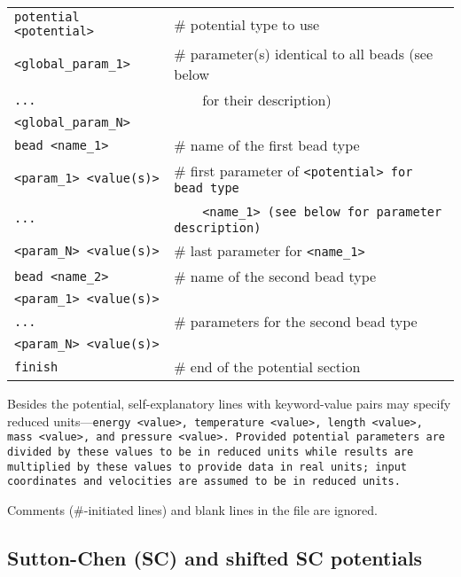 \begin{longtable}{ll}
  \tt{potential <potential>} & \# potential type to use\\
  \tt{<global_param_1>}      & \# parameter(s) identical to all beads (see
                               below\\
  \tt{...}                   & \ \ \ \ for their description)\\
  \tt{<global_param_N>}      & \\
  \tt{bead <name_1>}         & \# name of the first bead type\\
  \tt{<param_1> <value(s)>}  & \# first parameter of \tt{<potential>} for
                               bead type\\
  \tt{...}                   & \ \ \ \ \tt{<name_1>} (see below for parameter
                               description)\\
  \tt{<param_N> <value(s)>}  & \# last parameter for \tt{<name_1>}\\
  \tt{bead <name_2>}         & \# name of the second bead type\\
  \tt{<param_1> <value(s)>}  & \\
  \tt{...}                   & \# parameters for the second bead type\\
  \tt{<param_N> <value(s)>}  & \\
  \tt{finish}                & \# end of the potential section \\
\end{longtable}

Besides the potential, self-explanatory lines with keyword-value pairs may
specify reduced units---\tt{energy <value>}, \tt{temperature <value>},
\tt{length <value>}, \tt{mass <value>}, and \tt{pressure <value>}. Provided
potential parameters are divided by these values to be in reduced units while
results are multiplied by these values to provide data in real units; input
coordinates and velocities are assumed to be in reduced units.

Comments (\#-initiated lines) and blank lines in the file are ignored.

\subsection{Sutton-Chen (SC) and shifted SC potentials}

